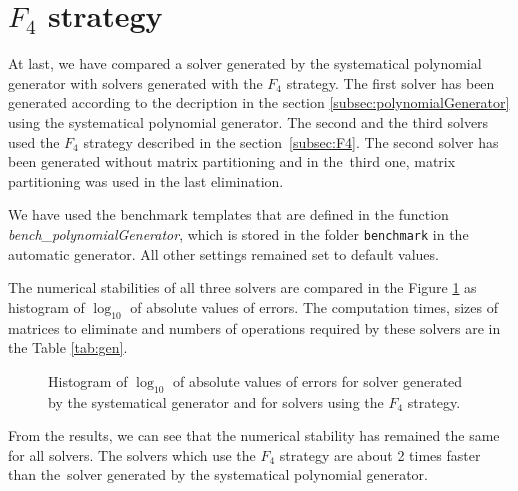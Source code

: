 \section{$F_4$ strategy}
\label{exp:gen}
At last, we have compared a solver generated by the systematical polynomial generator with solvers generated with the $F_4$ strategy. The first solver has been generated according to the decription in the section \ref{subsec:polynomialGenerator} using the systematical polynomial generator. The second and the third solvers used the $F_4$ strategy described in the section~\ref{subsec:F4}. The second solver has been generated without matrix partitioning and in the~third one, matrix partitioning was used in the last elimination.

We have used the benchmark templates that are defined in the function \textit{bench\_poly\-nomialGenerator}, which is stored in the folder \texttt{benchmark} in the automatic generator. All other settings remained set to default values.

The numerical stabilities of all three solvers are compared in the Figure \ref{graph:gen} as histogram of $\log_{10}$ of absolute values of errors. The computation times, sizes of matrices to eliminate and numbers of operations required by these solvers are in the Table \ref{tab:gen}.

\begin{figure}[ht]
  \centering
  \resizebox{0.95\textwidth}{!}{}
  \caption{Histogram of $\log_{10}$ of absolute values of errors for solver generated by the systematical generator and for solvers using the $F_4$ strategy.}
  \label{graph:gen}
\end{figure}

From the results, we can see that the numerical stability has remained the same for all solvers. The solvers which use the $F_4$ strategy are about 2 times faster than the~solver generated by the systematical polynomial generator.

